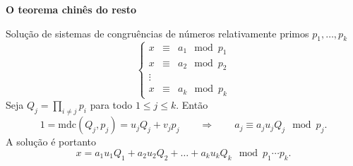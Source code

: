 \documentclass[handout]{beamer}
\newcommand{\mdc}[2]{\mathrm{mdc}({#1}, {#2})}
\begin{document}
\begin{frame}{\bf O teorema chinês do resto}

Solução de sistemas de congruências de números relativamente primos $p_1, \ldots, p_k$
$$\left\{ \begin{array}{rcl} x &\equiv& a_1 \mod p_1 \\ x &\equiv& a_2 \mod p_2 \\ \vdots &&\\
x &\equiv& a_k \mod p_k\end{array}\right.$$
Seja $Q_j = \prod_{i\neq j} p_i$ para todo $1\leq j\leq k$. Então 
$$1=\mdc{Q_j}{p_j} = u_jQ_j + v_jp_j \qquad \Rightarrow \qquad  a_j \equiv a_ju_j Q_j \mod p_j.$$
A solução é portanto
$$ x = a_1u_1Q_1 + a_2u_2Q_2 + \ldots + a_ku_kQ_k \mod p_1\cdots p_k.$$


\end{frame}
\end{document}
